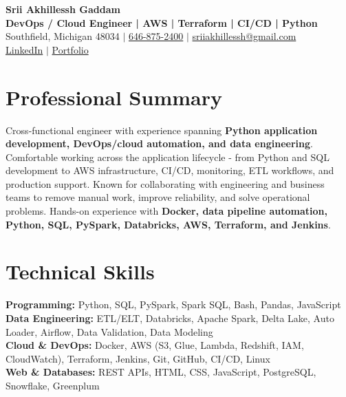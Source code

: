 \documentclass[letterpaper,10pt]{article}
\begin{document}
\fontsize{9.35pt}{10.45pt}\selectfont

\begin{center}
    {\LARGE \textbf{Srii Akhillessh Gaddam}} \\[-1pt]
    \textbf{DevOps / Cloud Engineer | AWS | Terraform | CI/CD | Python} \\[2pt]
    Southfield, Michigan 48034 $|$
    \href{tel:6468752400}{646-875-2400} $|$
    \href{mailto:sriiakhillessh@gmail.com}{sriiakhillessh@gmail.com} \\[1pt]
    \href{https://www.linkedin.com/in/srii-akhiilessh-gaddam-b48668191/}{LinkedIn} $|$
    \href{https://sriiakhillesshg.github.io/portfolio/}{Portfolio}
\end{center}
\vspace{-8pt}

\section{Professional Summary}
\small{Cross-functional engineer with experience spanning \textbf{Python application development, DevOps/cloud automation, and data engineering}. Comfortable working across the application lifecycle - from Python and SQL development to AWS infrastructure, CI/CD, monitoring, ETL workflows, and production support. Known for collaborating with engineering and business teams to remove manual work, improve reliability, and solve operational problems. Hands-on experience with \textbf{Docker, data pipeline automation, Python, SQL, PySpark, Databricks, AWS, Terraform, and Jenkins}.}

\section{Technical Skills}
\small{
\textbf{Programming:} Python, SQL, PySpark, Spark SQL, Bash, Pandas, JavaScript \\
\textbf{Data Engineering:} ETL/ELT, Databricks, Apache Spark, Delta Lake, Auto Loader, Airflow, Data Validation, Data Modeling \\
\textbf{Cloud \& DevOps:} Docker, AWS (S3, Glue, Lambda, Redshift, IAM, CloudWatch), Terraform, Jenkins, Git, GitHub, CI/CD, Linux \\
\textbf{Web \& Databases:} REST APIs, HTML, CSS, JavaScript, PostgreSQL, Snowflake, Greenplum
}
\end{document}
